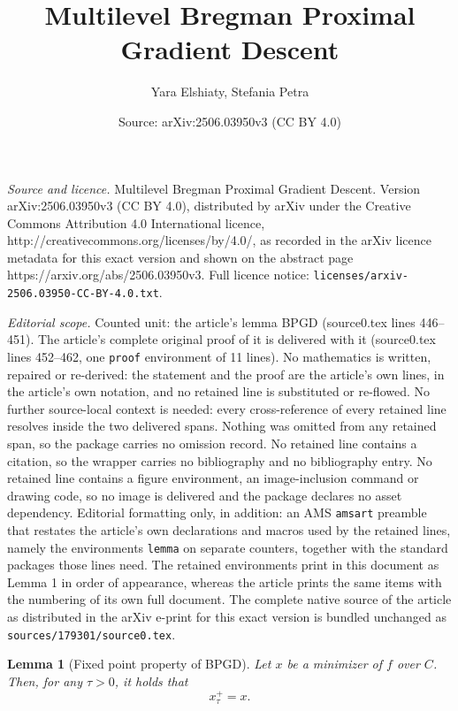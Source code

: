 \documentclass[10pt,a4paper]{amsart}
\title{Multilevel Bregman Proximal Gradient Descent}
\author{Yara Elshiaty, Stefania Petra}
\date{Source: arXiv:2506.03950v3 (CC BY 4.0)}
\newtheorem{lemma}{Lemma}
\begin{document}
\maketitle

\noindent\emph{Source and licence.} Multilevel Bregman Proximal Gradient Descent. Version arXiv:2506.03950v3 (CC BY 4.0), distributed by arXiv under the Creative Commons Attribution 4.0 International licence, http://creativecommons.org/licenses/by/4.0/, as recorded in the arXiv licence metadata for this exact version and shown on the abstract page https://arxiv.org/abs/2506.03950v3. Full licence notice: \texttt{licenses/arxiv-2506.03950-CC-BY-4.0.txt}.\par\smallskip

\noindent\textit{Editorial scope.} Counted unit: the article's lemma BPGD (source0.tex lines 446--451). The article's complete original proof of it is delivered with it (source0.tex lines 452--462, one \texttt{proof} environment of 11 lines). No mathematics is written, repaired or re-derived: the statement and the proof are the article's own lines, in the article's own notation, and no retained line is substituted or re-flowed.  No further source-local context is needed: every cross-reference of every retained line resolves inside the two delivered spans.  Nothing was omitted from any retained span, so the package carries no omission record.  No retained line contains a citation, so the wrapper carries no bibliography and no bibliography entry.  No retained line contains a figure environment, an image-inclusion command or drawing code, so no image is delivered and the package declares no asset dependency.  Editorial formatting only, in addition: an AMS \texttt{amsart} preamble that restates the article's own declarations and macros used by the retained lines, namely the environments \texttt{lemma} on separate counters, together with the standard packages those lines need.  The retained environments print in this document as Lemma 1 in order of appearance, whereas the article prints the same items with the numbering of its own full document.  The complete native source of the article as distributed in the arXiv e-print for this exact version is bundled unchanged as \texttt{sources/179301/source0.tex}.
\begin{lemma}[Fixed point property of BPGD] \label{lm: fixed point property of BPGD}
    Let $x$ be a minimizer of $f$ over $C$. Then, for any $\tau > 0$, it holds that
    \begin{equation}
        x^+_\tau=x.
    \end{equation}
\end{lemma}
\end{document}
